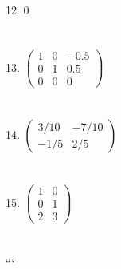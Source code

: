 \documentclass[fleqn]{article}
\begin{document}
12. \(0\)\\\\\\
13. \(\begin{pmatrix} 1 & 0 & -0.5 \\ 0 & 1 & 0.5 \\ 0 & 0 & 0 \end{pmatrix}\)\\\\\\
14. \(\begin{pmatrix} 3/10 & -7/10 \\ -1/5 & 2/5 \end{pmatrix}\)\\\\\\
15. \(\begin{pmatrix} 1 & 0 \\ 0 & 1 \\ 2 & 3 \end{pmatrix}\)\\\\\\
```      
        
\end{document}

